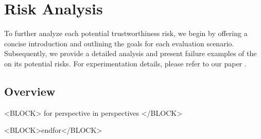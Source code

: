 \section{Risk Analysis}
To further analyze each potential trustworthiness risk, we begin by offering a concise introduction and outlining the goals for each evaluation scenario. Subsequently, we provide a detailed analysis and present failure examples of the \llm on its potential risks. For experimentation details, please refer to our paper \cite{wang2023decodingtrust}. 
\subsection{Overview}
<BLOCK> for perspective in perspectives </BLOCK>

<BLOCK>endfor</BLOCK>
\newpage

